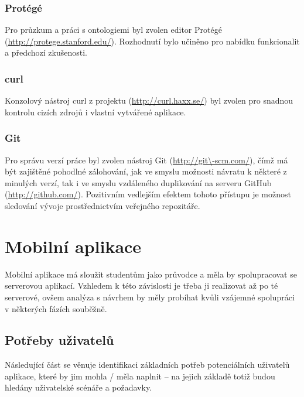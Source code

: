 \subsubsection{Protégé}
Pro průzkum a práci s ontologiemi byl zvolen editor Protégé (\url{http://protege.stanford.edu/}). Rozhodnutí bylo učiněno pro nabídku funkcionalit a předchozí zkušenosti.

\subsubsection{curl}
Konzolový nástroj curl z projektu  (\url{http://curl.haxx.se/}) byl zvolen pro snadnou kontrolu cizích zdrojů i vlastní vytvářené aplikace.

\subsubsection{Git}
\label{sec:server:tools:git}
Pro správu verzí práce byl zvolen nástroj Git (\url{http://git\-scm.com/}), čímž má být zajištěné pohodlné zálohování, jak ve smyslu možnosti návratu k některé z minulých verzí, tak i ve smyslu vzdáleného duplikování na serveru GitHub (\url{http://github.com/}). Pozitivním vedlejším efektem tohoto přístupu je možnost sledování vývoje prostřednictvím veřejného repozitáře.


\section{Mobilní aplikace}
Mobilní aplikace má sloužit studentům jako průvodce a měla by spolupracovat se serverovou aplikací. Vzhledem k této závislosti je třeba ji realizovat až po té serverové, ovšem analýza s návrhem by měly probíhat kvůli vzájemné spolupráci v některých fázích souběžně.

\subsection{Potřeby uživatelů}
Následující část se věnuje identifikaci základních potřeb potenciálních uživatelů aplikace, které by jim mohla / měla naplnit -- na jejich základě totiž budou hledány uživatelské scénáře a požadavky.

